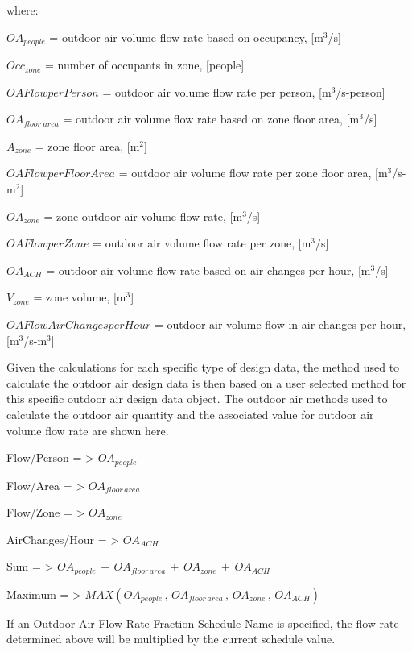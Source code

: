 where:

\(O{A_{people}}\) = outdoor air volume flow rate based on occupancy, {[}m\(^{3}\)/s{]}

\(Oc{c_{zone}}\) = number of occupants in zone, {[}people{]}

\(OAFlowperPerson\) = outdoor air volume flow rate per person, {[}m\(^{3}\)/s-person{]}

\(O{A_{floor\;area}}\) = outdoor air volume flow rate based on zone floor area, {[}m\(^{3}\)/s{]}

\({A_{zone}}\) = zone floor area, {[}m\(^{2}\){]}

\(OAFlowperFloorArea\) = outdoor air volume flow rate per zone floor area, {[}m\(^{3}\)/s-m\(^{2}\){]}

\(O{A_{zone}}\) = zone outdoor air volume flow rate, {[}m\(^{3}\)/s{]}

\(OAFlowperZone\) = outdoor air volume flow rate per zone, {[}m\(^{3}\)/s{]}

\(O{A_{ACH}}\) = outdoor air volume flow rate based on air changes per hour, {[}m\(^{3}\)/s{]}

\({V_{zone}}\) = zone volume, {[}m\(^{3}\){]}

\(OAFlowAirChangesperHour\) = outdoor air volume flow in air changes per hour, {[}m\(^{3}\)/s-m\(^{3}\){]}

Given the calculations for each specific type of design data, the method used to calculate the outdoor air design data is then based on a user selected method for this specific outdoor air design data object. The outdoor air methods used to calculate the outdoor air quantity and the associated value for outdoor air volume flow rate are shown here.

Flow/Person = \textgreater{} \(O{A_{people}}\)

Flow/Area = \textgreater{} \(O{A_{floor\,area}}\)

Flow/Zone = \textgreater{} \(O{A_{zone}}\)

AirChanges/Hour = \textgreater{} \(O{A_{ACH}}\)

Sum = \textgreater{} \(O{A_{people}}\, + \,O{A_{floor\,area}}\, + \,O{A_{zone}}\, + \,O{A_{ACH}}\)

Maximum = \textgreater{} \(MAX\left( {O{A_{people}}\,,\,O{A_{floor\,area}}\,,\,O{A_{zone}}\,,\,O{A_{ACH}}} \right)\)

If an Outdoor Air Flow Rate Fraction Schedule Name is specified, the flow rate determined above will be multiplied by the current schedule value.

